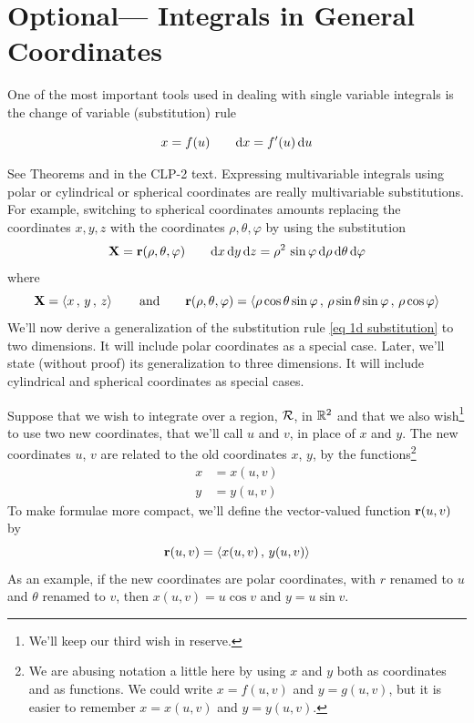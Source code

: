 \section{Optional--- Integrals in General Coordinates} \label{sec Jacobian}
One of the most important tools used in dealing with single variable
integrals is the change of variable (substitution) rule
\begin{impeqn}\label{eq 1d substitution}
\begin{equation*}
x=f(u)\qquad
\mathrm{d}x = f'(u)\,\mathrm{d}u
\end{equation*}
\end{impeqn}
\noindent
See Theorems  and 
in the CLP-2 text.
Expressing multivariable integrals using polar or cylindrical or
spherical coordinates are really  multivariable substitutions. For example,
switching to spherical coordinates amounts replacing the coordinates $x,y,z$ with the coordinates $\rho,\theta,\varphi$ by using the substitution
\begin{equation*}
\mathbf{X} =\mathbf{r}(\rho,\theta,\varphi)\qquad
\mathrm{d}x\,\mathrm{d}y\,\mathrm{d}z 
       = \rho^2\,\sin\varphi\,\mathrm{d}\rho\,\mathrm{d}\theta\,\mathrm{d}\varphi
\end{equation*}
where
\begin{equation*}
\mathbf{X}=\left< x\,,\, y\,,\, z\right>\qquad\text{and}\qquad
\mathbf{r}(\rho,\theta,\varphi)=\left< \rho\cos\theta\sin\varphi\,,\,
                              \rho\sin\theta\sin\varphi\,,\,
                              \rho\cos\varphi\right>
\end{equation*}
We'll now derive a generalization of the substitution rule 
\eqref{eq 1d substitution} to two dimensions. It will include polar
coordinates as a special case. Later, we'll state (without proof) 
its generalization to three dimensions. It will include cylindrical and
spherical coordinates as special cases.


Suppose that we wish to integrate over a region, $\mathcal{R}$, in $\mathbb{R}^2$ and that
we also wish\footnote{We'll keep our third wish in reserve.} to use two new coordinates, that we'll call $u$ and $v$, in place 
of $x$ and $y$. The new coordinates $u$, $v$ are related to the old coordinates
$x$, $y$, by the functions\footnote{We are abusing notation a little here by
using $x$ and $y$ both as coordinates and as functions. We could
write $x=f(u,v)$ and $y=g(u,v)$, but it is easier to remember
$x=x(u,v)$ and $y=y(u,v)$.}
\begin{align*}
x&=x(u,v) \\
y&=y(u,v)
\end{align*}
To make formulae more compact, we'll define the vector-valued function 
$\mathbf{r}(u,v)$ by
\begin{equation*}
\mathbf{r}(u,v) = \left< x(u,v) \,,\, y(u,v) \right>
\end{equation*}
As an example, if the new coordinates are polar coordinates, with $r$
renamed to $u$ and $\theta$ renamed to $v$, then
$x(u,v) = u\cos v$ and $y=u\sin v$.


